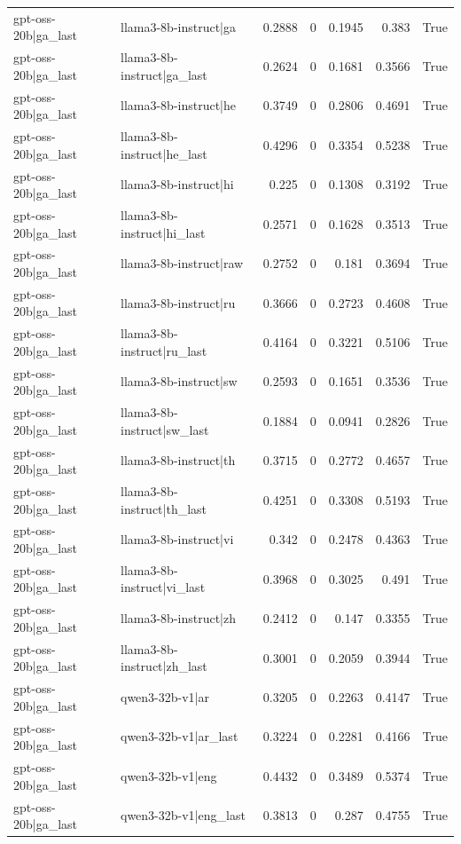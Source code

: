 \begin{table}
\begin{tabular}{l l r r r r l}
gpt-oss-20b|ga_last & llama3-8b-instruct|ga & 0.2888 & 0 & 0.1945 & 0.383 & True \\
gpt-oss-20b|ga_last & llama3-8b-instruct|ga_last & 0.2624 & 0 & 0.1681 & 0.3566 & True \\
gpt-oss-20b|ga_last & llama3-8b-instruct|he & 0.3749 & 0 & 0.2806 & 0.4691 & True \\
gpt-oss-20b|ga_last & llama3-8b-instruct|he_last & 0.4296 & 0 & 0.3354 & 0.5238 & True \\
gpt-oss-20b|ga_last & llama3-8b-instruct|hi & 0.225 & 0 & 0.1308 & 0.3192 & True \\
gpt-oss-20b|ga_last & llama3-8b-instruct|hi_last & 0.2571 & 0 & 0.1628 & 0.3513 & True \\
gpt-oss-20b|ga_last & llama3-8b-instruct|raw & 0.2752 & 0 & 0.181 & 0.3694 & True \\
gpt-oss-20b|ga_last & llama3-8b-instruct|ru & 0.3666 & 0 & 0.2723 & 0.4608 & True \\
gpt-oss-20b|ga_last & llama3-8b-instruct|ru_last & 0.4164 & 0 & 0.3221 & 0.5106 & True \\
gpt-oss-20b|ga_last & llama3-8b-instruct|sw & 0.2593 & 0 & 0.1651 & 0.3536 & True \\
gpt-oss-20b|ga_last & llama3-8b-instruct|sw_last & 0.1884 & 0 & 0.0941 & 0.2826 & True \\
gpt-oss-20b|ga_last & llama3-8b-instruct|th & 0.3715 & 0 & 0.2772 & 0.4657 & True \\
gpt-oss-20b|ga_last & llama3-8b-instruct|th_last & 0.4251 & 0 & 0.3308 & 0.5193 & True \\
gpt-oss-20b|ga_last & llama3-8b-instruct|vi & 0.342 & 0 & 0.2478 & 0.4363 & True \\
gpt-oss-20b|ga_last & llama3-8b-instruct|vi_last & 0.3968 & 0 & 0.3025 & 0.491 & True \\
gpt-oss-20b|ga_last & llama3-8b-instruct|zh & 0.2412 & 0 & 0.147 & 0.3355 & True \\
gpt-oss-20b|ga_last & llama3-8b-instruct|zh_last & 0.3001 & 0 & 0.2059 & 0.3944 & True \\
gpt-oss-20b|ga_last & qwen3-32b-v1|ar & 0.3205 & 0 & 0.2263 & 0.4147 & True \\
gpt-oss-20b|ga_last & qwen3-32b-v1|ar_last & 0.3224 & 0 & 0.2281 & 0.4166 & True \\
gpt-oss-20b|ga_last & qwen3-32b-v1|eng & 0.4432 & 0 & 0.3489 & 0.5374 & True \\
gpt-oss-20b|ga_last & qwen3-32b-v1|eng_last & 0.3813 & 0 & 0.287 & 0.4755 & True \\

\end{tabular}
\end{table}

